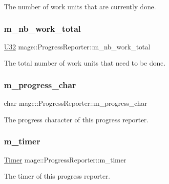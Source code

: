 The number of work units that are currently done. \hypertarget{classmage_1_1_progress_reporter_a5f3e7dd9faa3d247bd6dd3738aeb7120}{}\label{classmage_1_1_progress_reporter_a5f3e7dd9faa3d247bd6dd3738aeb7120} 
\subsubsection{\texorpdfstring{m\+\_\+nb\+\_\+work\+\_\+total}{m\_nb\_work\_total}}
{\footnotesize\ttfamily \hyperlink{namespacemage_a41c104c036fba3756a74e19f793eeaa1}{U32} mage\+::\+Progress\+Reporter\+::m\+\_\+nb\+\_\+work\+\_\+total\hspace{0.3cm}{\ttfamily [private]}}

The total number of work units that need to be done. \hypertarget{classmage_1_1_progress_reporter_a9bb1615723a33f21c8f0b9c5e5549a2d}{}\label{classmage_1_1_progress_reporter_a9bb1615723a33f21c8f0b9c5e5549a2d} 
\subsubsection{\texorpdfstring{m\+\_\+progress\+\_\+char}{m\_progress\_char}}
{\footnotesize\ttfamily char mage\+::\+Progress\+Reporter\+::m\+\_\+progress\+\_\+char\hspace{0.3cm}{\ttfamily [private]}}

The progress character of this progress reporter. \hypertarget{classmage_1_1_progress_reporter_aa3465bfcf344fd9f7f5f32255d90336b}{}\label{classmage_1_1_progress_reporter_aa3465bfcf344fd9f7f5f32255d90336b} 
\subsubsection{\texorpdfstring{m\+\_\+timer}{m\_timer}}
{\footnotesize\ttfamily \hyperlink{classmage_1_1_timer}{Timer} mage\+::\+Progress\+Reporter\+::m\+\_\+timer\hspace{0.3cm}{\ttfamily [private]}}

The timer of this progress reporter. 